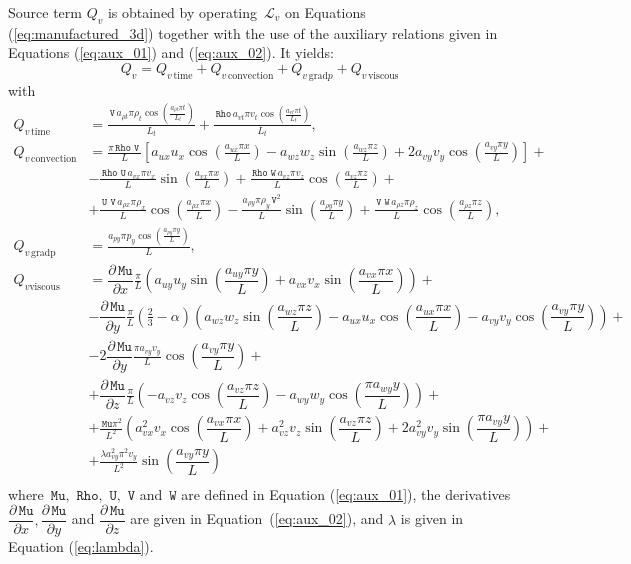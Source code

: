 \documentclass[10pt]{article}
\newcommand{\diff}[2] {\dfrac{\partial #1}{\partial #2}}
\newcommand{\Rho}{\,\mathtt{Rho}}
\newcommand{\U}{\,\mathtt{U}}
\newcommand{\V}{\,\mathtt{V}}
\newcommand{\W}{\,\mathtt{W}}
\newcommand{\Lo}{\,\mathcal{L}}
\newcommand{\Mu}{\,\mathtt{Mu}}
\newcommand{\DMuDx}{\diff{\Mu}{x}}
\newcommand{\DMuDy}{\diff{\Mu}{y}}
\newcommand{\DMuDz}{\diff{\Mu}{z}}
\newcommand{\convection}{\text{convection}}
\newcommand{\gradp}{\text{grad}p}
\newcommand{\viscous}{\text{viscous}}
\begin{document}
Source term $Q_v$ is obtained by operating $\Lo_{v}$ on Equations  (\ref{eq:manufactured_3d}) together with the use of the  auxiliary relations given in Equations (\ref{eq:aux_01}) and (\ref{eq:aux_02}). It yields:
\begin{equation*}
 \label{eq:ns1d_12}
Q_v = Q_{v \, \text{time}}+Q_{v \, \convection}+Q_{v \, \gradp }+Q_{v \, \viscous }
\end{equation*}
with
%
\begin{equation*}
 \begin{split}
 Q_{v \, \text{time}}&= \frac{\V \, a_{\rho t} \pi \rho_{t} \cos\left(\frac{a_{\rho t} \pi t}{L_t}\right)}{L_t} + \frac{ \Rho \, a_{vt}\pi v_{t} \cos\left(\frac{a_{vt} \pi t}{L_t}\right)}{L_t} ,\\
%
 Q_{v \, \text{convection}}&= 
\frac{\pi \Rho \, \V \, }{L} \left[a_{ux} u_{x} \cos\left(\frac{a_{ux} \pi x}{L}\right) - a_{wz} w_{z} \sin\left(\frac{a_{wz} \pi z}{L}\right) + 2 a_{vy} v_{y} \cos\left(\frac{a_{vy} \pi y}{L}\right)\right]+ \\ 
&- \frac{\Rho \, \U \, a_{vx} \pi v_{x} }{L}\sin\left(\frac{a_{vx} \pi x}{L}\right) + \frac{\Rho \, \W \, a_{vz} \pi v_{z} }{L} \cos\left(\frac{a_{vz} \pi z}{L}\right)+ \\ 
&+ \frac{\U \, \V \, a_{\rho x} \pi \rho_{x} }{L}\cos\left(\frac{a_{\rho x} \pi x}{L}\right) - \frac{a_{\rho y} \pi \rho_{y} \V^{2} }{L} \sin\left(\frac{a_{\rho y} \pi y}{L}\right)+ \frac{\V \, \W \, a_{\rho z} \pi \rho_{z} }{L}\cos\left(\frac{a_{\rho z} \pi z}{L}\right) ,\\
%
 Q_{v \, \text{gradp}}&= \frac{a_{py} \pi p_{y} \cos\left(\frac{a_{py} \pi y}{L}\right)}{L},\\
%
  Q_{v \viscous}&=  
\DMuDx \frac{\pi  }{L} \left(a_{uy} u_{y} \sin\left(\dfrac{a_{uy} \pi y}{L}\right) + a_{vx} v_{x}
\sin\left(\dfrac{a_{vx} \pi x}{L}\right)\right)+\\
%
&- \DMuDy \frac{\pi  }{L}\left(\frac{2}{3} - \alpha\right) \left(a_{wz} w_{z}
\sin\left(\dfrac{a_{wz} \pi z}{L}\right) - a_{ux} u_{x} \cos\left(\dfrac{a_{ux} \pi x}{L}\right) -
a_{vy} v_{y} \cos\left(\dfrac{a_{vy} \pi y}{L}\right)\right) +\\
%
%
&- 2 \DMuDy \frac{\pi  a_{vy} v_{y} }{L}\cos\left(\dfrac{a_{vy} \pi y}{L}\right)+\\
%
&+ \DMuDz \frac{\pi  }{L}\left(- a_{vz} v_{z}
\cos\left(\dfrac{a_{vz} \pi z}{L}\right) - a_{wy} w_{y} \cos\left(\dfrac{\pi a_{wy}
y}{L}\right)\right)+\\
%
& + \frac{\Mu \pi^{2} }{L^{2}}\left(a_{vx}^{2} v_{x} \cos\left(\dfrac{a_{vx} \pi x}{L}\right) + 
a_{vz}^{2} v_{z}\sin\left(\dfrac{a_{vz} \pi z}{L}\right) + 2a_{vy}^{2}  v_{y} \sin\left(\dfrac{\pi a_{vy}
y}{L}\right)\right) +\\
%
&+ \frac{\lambda a_{vy}^{2} \pi^{2} v_{y} }{L^{2}}\sin\left(\dfrac{a_{vy} \pi y}{L}\right) \\
%
 \end{split}
\end{equation*}
where $\Mu,\, \Rho,\,\U,\,\V$ and $\W$  are defined in Equation (\ref{eq:aux_01}), the derivatives $\DMuDx,\DMuDy$ and $\DMuDz$ are given in Equation~(\ref{eq:aux_02}), and $\lambda$ is given in Equation (\ref{eq:lambda}).
\end{document}
